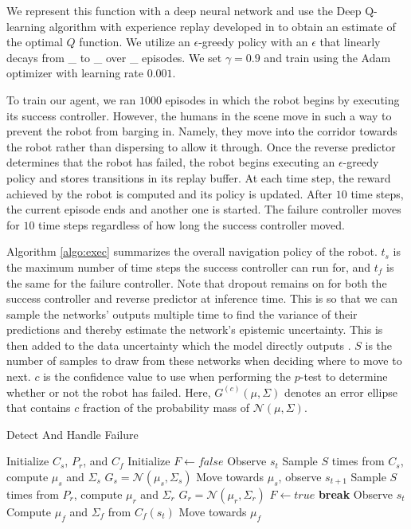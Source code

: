 \documentclass[letterpaper, 10 pt, conference]{ieeeconf}  %
\begin{document}
		We represent this function with a deep neural network and use the Deep Q-learning algorithm with experience replay developed in \cite{dqn} to obtain an estimate of the optimal $Q$ function. We utilize an $\epsilon$-greedy policy with an $\epsilon$ that linearly decays from \_ to \_ over \_ episodes. We set $\gamma=0.9$ and train using the Adam optimizer with learning rate $0.001$. 
		
		To train our agent, we ran $1000$ episodes in which the robot begins by executing its success controller. However, the humans in the scene move in such a way to prevent the robot from barging in. Namely, they move into the corridor towards the robot rather than dispersing to allow it through. Once the reverse predictor determines that the robot has failed, the robot begins executing an $\epsilon$-greedy policy and stores transitions in its replay buffer. At each time step, the reward achieved by the robot is computed and its policy is updated. After $10$ time steps, the current episode ends and another one is started. The failure controller moves for $10$ time steps regardless of how long the success controller moved. 
		
		Algorithm \ref{algo:exec} summarizes the overall navigation policy of the robot. $t_s$ is the maximum number of time steps the success controller can run for, and $t_f$ is the same for the failure controller. Note that dropout remains on for both the success controller and reverse predictor at inference time. This is so that we can sample the networks' outputs multiple time to find the variance of their predictions and thereby estimate the network's epistemic uncertainty. This is then added to the data uncertainty which the model directly outputs \cite{gal2016uncertainty}. $S$ is the number of samples to draw from these networks when deciding where to move to next. $c$ is the confidence value to use when performing the $p$-test to determine whether or not the robot has failed. Here, $G^{(c)}(\mu, \Sigma)$ denotes an error ellipse that contains $c$ fraction of the probability mass of $\mathcal{N}(\mu, \Sigma)$. 
		
		\begin{algorithm}[H]
			\caption{Detect And Handle Failure}
			\label{algo:exec}
			\begin{algorithmic}
				\State Initialize $C_s$, $P_r$, and $C_f$
				\State Initialize $F\leftarrow false$
				\State Observe $s_t$
				\State Sample $S$ times from $C_s$, compute $\mu_s$ and $\Sigma_s$
				\State $G_s = \mathcal{N}(\mu_s, \Sigma_s)$
				\State Move towards $\mu_s$, observe $s_{t+1}$
				\State Sample $S$ times from $P_r$, compute $\mu_r$ and $\Sigma_r$
				\State $G_r = \mathcal{N}(\mu_r, \Sigma_r)$
				\State $F\leftarrow true$
				\State \textbf{break}
				\EndIf
				\EndFor
				\State Observe $s_t$
				\State Compute $\mu_f$ and $\Sigma_f$ from $C_f(s_t)$
				\State Move towards $\mu_f$
				\EndFor
				\EndIf
				\EndFunction
			\end{algorithmic}
		\end{algorithm}
		
\end{document}
